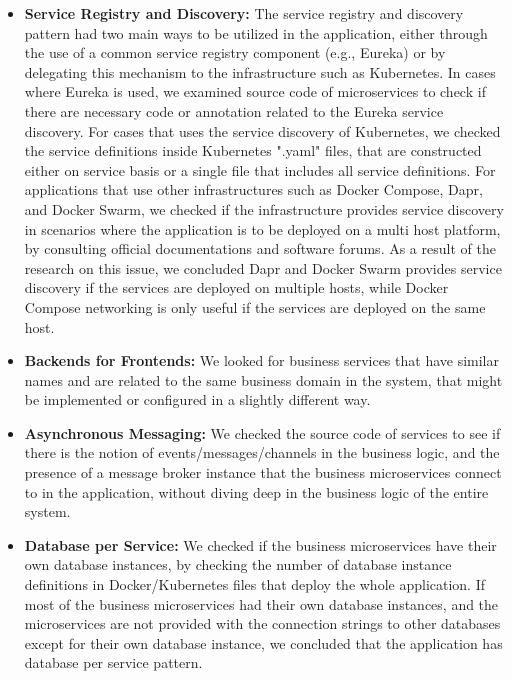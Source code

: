 \documentclass{Configuration_Files/PoliMi3i_thesis}
\begin{document}
\begin{itemize}
\begin{itemize}
        \item \textbf{Service Registry and Discovery:} The service registry and discovery pattern had two main ways to be utilized in the application, either through the use of a common service registry component (e.g., Eureka) or by delegating this mechanism to the infrastructure such as Kubernetes.
        In cases where Eureka is used, we examined source code of microservices to check if there are necessary code or annotation related to the Eureka service discovery.
        For cases that uses the service discovery of Kubernetes, we checked the service definitions inside Kubernetes ".yaml" files, that are constructed either on service basis or a single file that includes all service definitions.
        For applications that use other infrastructures such as Docker Compose, Dapr, and Docker Swarm, we checked if the infrastructure provides service discovery in scenarios where the application is to be deployed on a multi host platform, by consulting official documentations and software forums.
        As a result of the research on this issue, we concluded Dapr and Docker Swarm provides service discovery if the services are deployed on multiple hosts, while Docker Compose networking is only useful if the services are deployed on the same host.
        
        \item \textbf{Backends for Frontends:} We looked for business services that have similar names and are related to the same business domain in the system, that might be implemented or configured in a slightly different way.
        
        \item \textbf{Asynchronous Messaging:} We checked the source code of services to see if there is the notion of events/messages/channels in the business logic, and the presence of a message broker instance that the business microservices connect to in the application, without diving deep in the business logic of the entire system.
        
        \item \textbf{Database per Service:} We checked if the business microservices have their own database instances, by checking the number of database instance definitions in Docker/Kubernetes files that deploy the whole application.
        If most of the business microservices had their own database instances, and the microservices are not provided with the connection strings to other databases except for their own database instance, we concluded that the application has database per service pattern.
        

\end{itemize}
\end{itemize}
\end{document}
